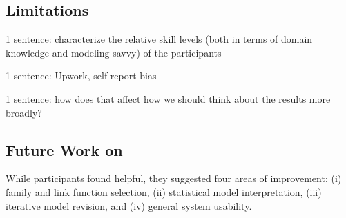 


\subsection{Limitations}

1 sentence: characterize the relative skill levels (both in terms of domain knowledge and
modeling savvy) of the participants

1 sentence: Upwork, self-report bias

1 sentence: how does that affect how we should
think about the results more broadly?

\subsection{Future Work on \rTisane}
While participants found \rTisane helpful, they suggested four areas of
improvement: (i) family and link function selection, (ii) statistical model
interpretation, (iii) iterative model revision, and (iv) general system
usability. 

